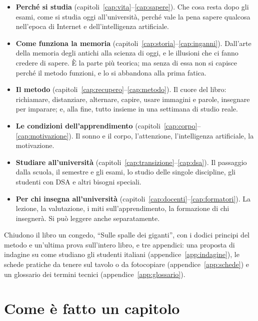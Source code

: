\begin{itemize}[leftmargin=1.2em, itemsep=0.3\baselineskip]
  \item \textbf{Perché si studia} (capitoli~\ref{cap:vita}--\ref{cap:sapere}).
        Che cosa resta dopo gli esami, come si studia oggi
        all'università, perché vale la pena sapere qualcosa nell'epoca
        di Internet e dell'intelligenza artificiale.
  \item \textbf{Come funziona la memoria}
        (capitoli~\ref{cap:storia}--\ref{cap:inganni}). Dall'arte della
        memoria degli antichi alla scienza di oggi, e le illusioni che
        ci fanno credere di sapere. È la parte più teorica; ma senza di
        essa non si capisce perché il metodo funzioni, e lo si
        abbandona alla prima fatica.
  \item \textbf{Il metodo}
        (capitoli~\ref{cap:recupero}--\ref{cap:metodo}). Il cuore del
        libro: richiamare, distanziare, alternare, capire, usare
        immagini e parole, insegnare per imparare; e, alla fine, tutto
        insieme in una settimana di studio reale.
  \item \textbf{Le condizioni dell'apprendimento}
        (capitoli~\ref{cap:corpo}--\ref{cap:motivazione}). Il sonno e
        il corpo, l'attenzione, l'intelligenza artificiale, la
        motivazione.
  \item \textbf{Studiare all'università}
        (capitoli~\ref{cap:transizione}--\ref{cap:dsa}). Il passaggio
        dalla scuola, il semestre e gli esami, lo studio delle singole
        discipline, gli studenti con DSA e altri bisogni speciali.
  \item \textbf{Per chi insegna all'università}
        (capitoli~\ref{cap:docenti}--\ref{cap:formatori}). La lezione,
        la valutazione, i miti sull'apprendimento, la formazione di chi
        insegnerà. Si può leggere anche separatamente.
\end{itemize}

Chiudono il libro un congedo, \enquote{Sulle spalle dei giganti}, con
i dodici principi del metodo e un'ultima prova sull'intero libro, e tre
appendici: una proposta di indagine su come studiano gli studenti
italiani (appendice~\ref{app:indagine}), le schede pratiche da tenere
sul tavolo o da fotocopiare (appendice~\ref{app:schede}) e un glossario
dei termini tecnici (appendice~\ref{app:glossario}).

\section*{Come è fatto un capitolo}

